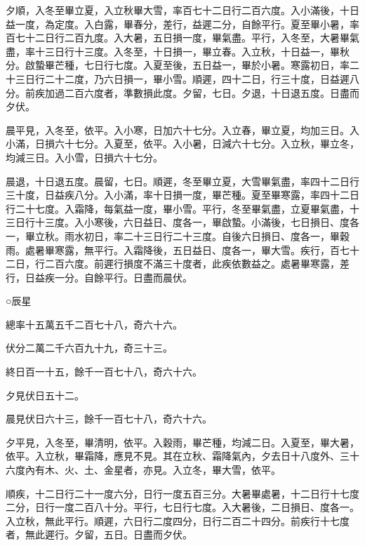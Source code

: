 \begin{pinyinscope}
 夕順，入冬至畢立夏，入立秋畢大雪，率百七十二日行二百六度。入小滿後，十日益一度，為定度。入白露，畢春分，差行，益遲二分，自餘平行。夏至畢小暑，率百七十二日行二百九度。入大暑，五日損一度，畢氣盡。平行，入冬至，大暑畢氣盡，率十三日行十三度。入冬至，十日損一，畢立春。入立秋，十日益一，畢秋分。啟蟄畢芒種，七日行七度。入夏至後，五日益一，畢於小暑。寒露初日，率二十三日行二十二度，乃六日損一，畢小雪。順遲，四十二日，行三十度，日益遲八分。前疾加過二百六度者，準數損此度。夕留，七日。夕退，十日退五度。日盡而夕伏。



 晨平見，入冬至，依平。入小寒，日加六十七分。入立春，畢立夏，均加三日。入小滿，日損六十七分。入夏至，依平。入小暑，日減六十七分。入立秋，畢立冬，均減三日。入小雪，日損六十七分。



 晨退，十日退五度。晨留，七日。順遲，冬至畢立夏，大雪畢氣盡，率四十二日行三十度，日益疾八分。入小滿，率十日損一度，畢芒種。夏至畢寒露，率四十二日行二十七度。入霜降，每氣益一度，畢小雪。平行，冬至畢氣盡，立夏畢氣盡，十三日行十三度。入小寒後，六日益日、度各一，畢啟蟄。小滿後，七日損日、度各一，畢立秋。雨水初日，率二十三日行二十三度。自後六日損日、度各一，畢穀雨。處暑畢寒露，無平行。入霜降後，五日益日、度各一，畢大雪。疾行，百七十二日，行二百六度。前遲行損度不滿三十度者，此疾依數益之。處暑畢寒露，差行，日益疾一分。自餘平行。日盡而晨伏。



 ○辰星



 總率十五萬五千二百七十八，奇六十六。



 伏分二萬二千六百九十九，奇三十三。



 終日百一十五，餘千一百七十八，奇六十六。



 夕見伏日五十二。



 晨見伏日六十三，餘千一百七十八，奇六十六。



 夕平見，入冬至，畢清明，依平。入穀雨，畢芒種，均減二日。入夏至，畢大暑，依平。入立秋，畢霜降，應見不見。其在立秋、霜降氣內，夕去日十八度外、三十六度內有木、火、土、金星者，亦見。入立冬，畢大雪，依平。



 順疾，十二日行二十一度六分，日行一度五百三分。大暑畢處暑，十二日行十七度二分，日行一度二百八十分。平行，七日行七度。入大暑後，二日損日、度各一。入立秋，無此平行。順遲，六日行二度四分，日行二百二十四分。前疾行十七度者，無此遲行。夕留，五日。日盡而夕伏。




\end{pinyinscope}
